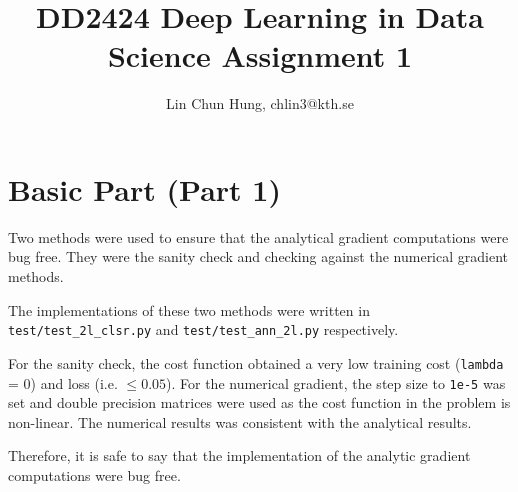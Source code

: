 \documentclass[12pt]{article}
\newenvironment{question}[2][Question]{\begin{trivlist}
\kern10pt
\item[\hskip \labelsep {\bfseries #1}\hskip \labelsep {\bfseries #2.}]}{\end{trivlist}}
\begin{document}
\title{DD2424 Deep Learning in Data Science Assignment 1}
\author{Lin Chun Hung, chlin3@kth.se}

\maketitle

\section{Basic Part (Part 1)}
\begin{question}{2.i}
Two methods were used to ensure that the analytical gradient computations were bug
free.
They were the sanity check and checking against the numerical gradient methods.

The implementations of these two methods were written in
\texttt{test/test\_2l\_clsr.py} and \texttt{test/test\_ann\_2l.py} respectively.

For the sanity check, the cost function obtained a very low training cost (\texttt{lambda} = 0)
and loss (i.e. $\leq 0.05$).
For the numerical gradient, the step size to \texttt{1e-5} was set and
double precision matrices were used as the cost function in the problem is non-linear.
The numerical results was consistent with the analytical results.

Therefore, it is safe to say that the implementation of the
analytic gradient computations were bug free.
\end{question}
\end{document}
